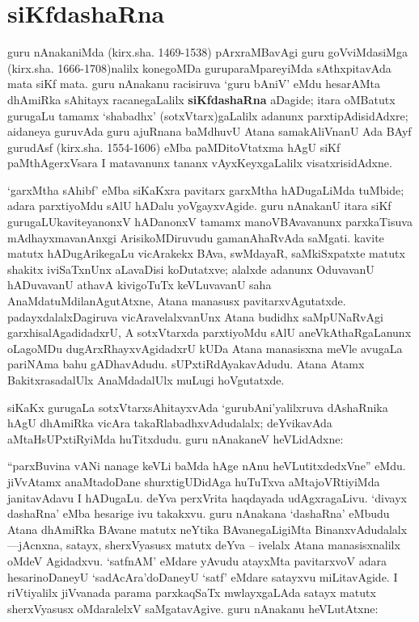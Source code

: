 \chapter{siKfdashaRna}\label{chap007}

guru nAnakaniMda (kirx.sha. {\rm 1469-1538}) pArxraMBavAgi guru goVviMdasiMga (kirx.sha. {\rm 1666-1708})nalilx konegoMDa guruparaMpareyiMda sAthxpitavAda mata siKf mata. guru nAnakanu racisiruva `guru bAniV' eMdu hesarAMta dhAmiRka sAhitayx racanegaLalilx {\bf siKfdashaRna} aDagide; itara oMBatutx gurugaLu tamamx `shabadhx' (sotxVtarx)gaLalilx adanunx parxtipAdisidAdxre; aidaneya guruvAda guru ajuRnana baMdhuvU Atana samakAliVnanU Ada BAyf gurudAsf (kirx.sha. {\rm 1554-1606}) eMba paMDitoVtatxma hAgU siKf paMthAgerxVsara I matavanunx tananx vAyxKeyxgaLalilx visatxrisidAdxne.

`garxMtha sAhibf' eMba siKaKxra pavitarx garxMtha hADugaLiMda tuMbide; adara parxti\-yoMdu sAlU hADalu yoVgayxvAgide. guru nAnakanU itara siKf gurugaLU\break kaviteyanonxV hADanonxV tamamx manoVBAvavanunx parxkaTisuva mAdhayxmavanAnxgi Arisi\-koMDiruvudu gamanAhaRvAda saMgati. kavite matutx hADugArikegaLu vicArakekx BAva, swMdayaR, saMkiSxpatxte matutx shakitx iviSaTxnUnx aLavaDisi koDutatxve; alalxde adanunx OduvavanU hADuvavanU athavA kivigoTuTx keVLuvavanU saha AnaMdatuMdila\-nAgutAtxne, Atana manasusx pavitarxvAgutatxde. padayxdalalxDagiruva vicAravelalxvanUnx Atana budidhx saMpUNaRvAgi garxhisalAgadidadxrU, A sotxVtarxda parxtiyoMdu sAlU aneVkAthaRgaLanunx oLagoMDu dugArxRhayxvAgidadxrU kUDa Atana manasisxna meVle avugaLa pari\-NAma bahu gADhavAdudu. sUPxtiRdAyakavAdudu. Atana Atamx BakitxrasadalUlx AnaMda\-dalUlx muLugi hoVgutatxde.

siKaKx gurugaLa sotxVtarxsAhitayxvAda `gurubAni'yalilxruva dAshaRnika hAgU dhAmiRka vicAra takaRlabadhxvAdudalalx; deYvikavAda aMtaHsUPxtiRyiMda huTitxdudu. guru nAnakaneV heVLidAdxne:

``parxBuvina vANi nanage keVLi baMda hAge nAnu heVLutitxdedxVne'' eMdu. jiVvAtamx anaMtadoDane shurxtigUDidAga huTuTxva aMtajoVRtiyiMda janitavAdavu I hADugaLu. deYva perxVrita haqdayada udAgxragaLivu. `divayx dashaRna' eMba hesarige ivu takakxvu. guru nAnakana `dashaRna' eMbudu Atana dhAmiRka BAvane matutx neYtika BAvanegaLigiMta BinanxvAdudalalx---jAcnxna, satayx, sherxVyasusx matutx deYva -- ivelalx Atana manasisxnalilx oMdeV Agidadxvu. `satfnAM' eMdare yAvudu atayxMta pavitarxvoV adara hesarinoDaneyU `sadAcAra'doDaneyU `satf' eMdare satayxvu miLitavAgide. I riVtiyalilx jiVvanada parama parxkaqSaTx mwlayxgaLAda satayx matutx sherxVyasusx oMdaralelxV saMgatavAgive. guru nAnakanu heVLutAtxne:

